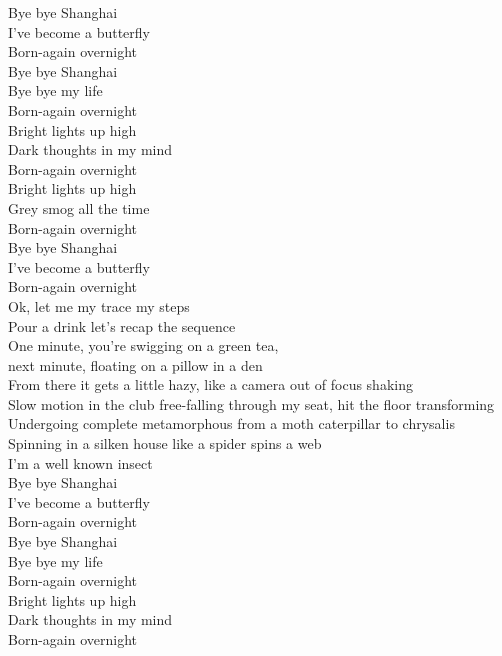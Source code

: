 


Bye bye Shanghai \\
I've become a butterfly \\
Born-again overnight \\
Bye bye Shanghai \\
Bye bye my life \\
Born-again overnight \\
Bright lights up high \\
Dark thoughts in my mind \\
Born-again overnight \\
Bright lights up high \\
Grey smog all the time \\
Born-again overnight \\
Bye bye Shanghai \\
I've become a butterfly \\
Born-again overnight \\

Ok, let me my trace my steps \\
Pour a drink let's recap the sequence \\
One minute, you're swigging on a green tea, \\
next minute, floating on a pillow in a den \\
From there it gets a little hazy, like a camera out of focus shaking \\
Slow motion in the club free-falling through my seat, hit the floor transforming \\
Undergoing complete metamorphous from a moth caterpillar to chrysalis \\
Spinning in a silken house like a spider spins a web \\
I'm a well known insect \\

Bye bye Shanghai \\
I've become a butterfly \\
Born-again overnight \\
Bye bye Shanghai \\
Bye bye my life \\
Born-again overnight \\
Bright lights up high \\
Dark thoughts in my mind \\
Born-again overnight \\

